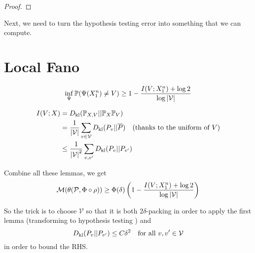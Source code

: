 \documentclass[11pt,a4paper]{article}
\begin{document}
\begin{proof}
    
\end{proof}

Next, we need to turn the hypothesis testing error into something that we can compute.

\section{Local Fano} 
\begin{lemma}
    \[
    \inf_{\Psi} \mathbb{P}(\Psi(X_1^{n}) \neq V) \geq 1 - \dfrac{I(V; X_1^{n}) + \log 2}{\log \left\lvert\mathcal{V}\right\rvert}
    \] 
\end{lemma}

\begin{lemma}
    \begin{align*}
        I(V; X) &= D_{\rm kl}( \mathbb{P}_{X, V} || \mathbb{P}_X \mathbb{P}_V)  \\
        &= \dfrac{1}{\left\lvert\mathcal{V}\right\rvert} \sum_{v \in \mathcal{V}} D_{\rm kl} (P_v || \overline{P}) \quad \text{(thanks to the uniform of $V$)} \\
        &\leq \dfrac{1}{\left\lvert\mathcal{V}\right\rvert^2} \sum_{v, v'}  D_{\rm kl}(P_v || P_{v'})
    \end{align*}
\end{lemma}
\begin{remark}
    Combine all these lemmas, we get
    \[
    \mathcal{M}(\theta(\mathcal{P}, \Phi \circ \rho)) 
    \geq \Phi(\delta) \left( 1 - \dfrac{I(V; X_1^{n}) + \log 2}{\log \left\lvert\mathcal{V}\right\rvert} \right)
    \] 
\end{remark}
So the trick is to choose $\mathcal{V}$ so that it is both $2\delta$-packing in order to apply the first lemma (transforming to hypothesis testing ) and 
\[
D_{\rm kl}(P_v || P_{v'}) \leq C \delta^2 \quad \text{for all $v, v' \in \mathcal{V}$}
\]
in order to bound the RHS.
\end{document}
